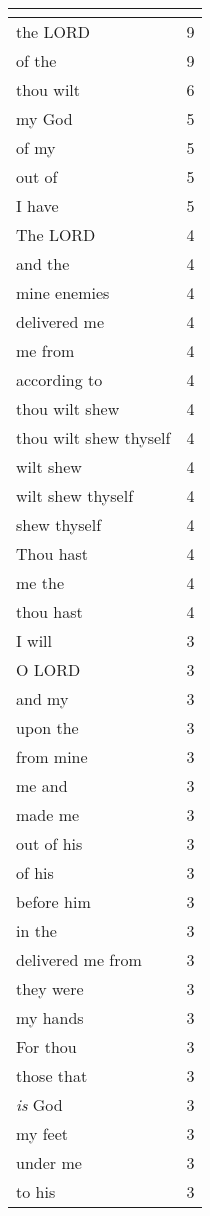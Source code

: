 \begin{center}
\begin{longtable}{|p{3.0in}|p{0.5in}|}
\hline \multicolumn{2}{c}{{ }} \\ \hline
\endfoot 
the LORD & 9\\ \hline 
of the & 9\\ \hline 
thou wilt & 6\\ \hline 
my God & 5\\ \hline 
of my & 5\\ \hline 
out of & 5\\ \hline 
I have & 5\\ \hline 
The LORD & 4\\ \hline 
and the & 4\\ \hline 
mine enemies & 4\\ \hline 
delivered me & 4\\ \hline 
me from & 4\\ \hline 
according to & 4\\ \hline 
thou wilt shew & 4\\ \hline 
thou wilt shew thyself & 4\\ \hline 
wilt shew & 4\\ \hline 
wilt shew thyself & 4\\ \hline 
shew thyself & 4\\ \hline 
Thou hast & 4\\ \hline 
me the & 4\\ \hline 
thou hast & 4\\ \hline 
I will & 3\\ \hline 
O LORD & 3\\ \hline 
and my & 3\\ \hline 
upon the & 3\\ \hline 
from mine & 3\\ \hline 
me and & 3\\ \hline 
made me & 3\\ \hline 
out of his & 3\\ \hline 
of his & 3\\ \hline 
before him & 3\\ \hline 
in the & 3\\ \hline 
delivered me from & 3\\ \hline 
they were & 3\\ \hline 
my hands & 3\\ \hline 
For thou & 3\\ \hline 
those that & 3\\ \hline 
\emph{is} God & 3\\ \hline 
my feet & 3\\ \hline 
under me & 3\\ \hline 
to his & 3\\ \hline 
\end{longtable}
\end{center}





